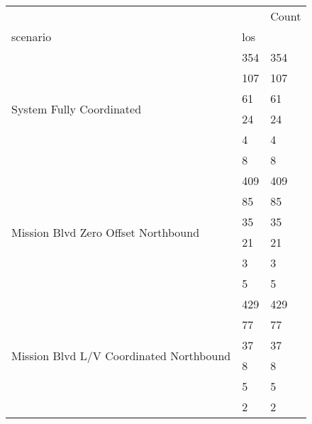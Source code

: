 \begin{tabular}{lll}
\toprule
 &  & Count \\
scenario & los &  \\
\midrule
\multirow[t]{6}{*}{System Fully Coordinated} & 354 & 354 \\
 & 107 & 107 \\
 & 61 & 61 \\
 & 24 & 24 \\
 & 4 & 4 \\
 & 8 & 8 \\
\multirow[t]{6}{*}{Mission Blvd Zero Offset Northbound} & 409 & 409 \\
 & 85 & 85 \\
 & 35 & 35 \\
 & 21 & 21 \\
 & 3 & 3 \\
 & 5 & 5 \\
\multirow[t]{6}{*}{Mission Blvd L/V Coordinated Northbound} & 429 & 429 \\
 & 77 & 77 \\
 & 37 & 37 \\
 & 8 & 8 \\
 & 5 & 5 \\
 & 2 & 2 \\
\bottomrule
\end{tabular}
